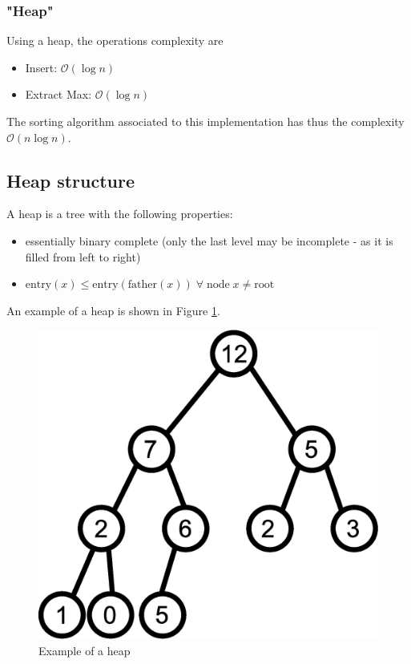 \subsubsection{"Heap"} Using a heap, the operations complexity are \begin{itemize}
\item Insert: $\mathcal{O}(\log n)$
\item Extract Max: $\mathcal{O}(\log n)$
\end{itemize}
The sorting algorithm associated to this implementation has thus the complexity $\mathcal{O} (n \log n)$.

\subsection{Heap structure}

A heap is a tree with the following properties:
\begin{itemize}
\item essentially binary complete (only the last level may be incomplete - as it is filled from left to right)
\item $\text{entry}(x) \leq \text{entry}(\text{father}(x)) \; \forall \; \text{node} \; x \neq \text{root}$
\end{itemize}
An example of a heap is shown in Figure \ref{tree1}.

\begin{figure}[h!]
\centering
\includegraphics[scale=0.5]{images/CM2/tree1.eps}
\caption{Example of a heap}
\label{tree1}
\end{figure}

